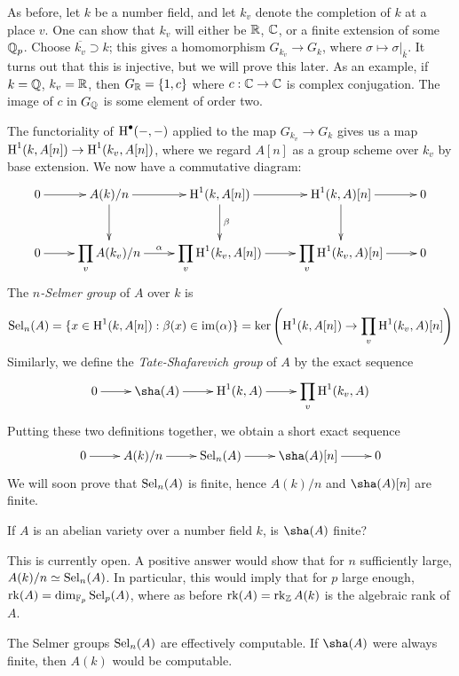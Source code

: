 \documentclass{article}
\begin{document}
As before, let $k$ be a number field, and let $k_v$ denote the completion of 
$k$ at a place $v$. One can show that $k_v$ will either be $\mathbb{R}$, $\mathbb{C}$, or a 
finite extension of some $\mathbb{Q}_p$. Choose $\overline{k_v}\supset k$; this gives 
a homomorphism $G_{k_v} \to G_k$, where $\sigma\mapsto \sigma|_{\bar k}$. It 
turns out that this is injective, but we will prove this later. As an example, 
if $k=\mathbb{Q}$, $k_v=\mathbb{R}$, then $G_{\mathbb{R}}=\{1,c\}$ where $c:\mathbb{C}\to \mathbb{C}$ is complex 
conjugation. The image of $c$ in $G_{\mathbb{Q}}$ is some element of order two. 

The functoriality of $\operatorname{H}^\bullet(-,-)$ applied to the map $G_{k_v} \to G_k$ 
gives us a map $\operatorname{H}^1(k,A[n]) \to \operatorname{H}^1(k_v,A[n])$, where we regard $A[n]$ as a 
group scheme over $k_v$ by base extension. We now have a commutative diagram: 
\[\xymatrix{
  0 \ar[r] 
    & A(k)/n \ar[r] \ar[d] 
    & \h^1(k,A[n]) \ar[r] \ar[d]^-\beta 
    & \h^1(k,A)[n] \ar[r] \ar[d] 
    & 0 \\
  0 \ar[r] 
    & \displaystyle\prod_v A(k_v)/n \ar[r]^-\alpha 
    & \displaystyle\prod_v \h^1(k_v,A[n]) \ar[r] 
    & \displaystyle\prod_v \h^1(k_v,A)[n] \ar[r] 
    & 0
}\]
The \emph{$n$-Selmer group} of $A$ over $k$ is 
\begin{align*}
  \operatorname{Sel}_n(A) = \{x\in \operatorname{H}^1(k,A[n]) : \beta(x) \in \operatorname{im}(\alpha)\} 
    = \ker\left(\operatorname{H}^1(k,A[n]) \to \prod_v \operatorname{H}^1(k_v,A)[n]\right)
\end{align*}
Similarly, we define the \emph{Tate-Shafarevich group} of $A$ by the exact 
sequence 
\[\xymatrix{
  0 \ar[r] 
    & \sha(A) \ar[r] 
    & \h^1(k,A) \ar[r]
    & \displaystyle\prod_v \h^1(k_v,A)
}\]
Putting these two definitions together, we obtain a short exact 
sequence 
\[\xymatrix{
  0 \ar[r] 
    & A(k)/n \ar[r] 
    & \sel_n(A) \ar[r] 
    & \sha(A)[n] \ar[r] 
    & 0
}\]
We will soon prove that $\operatorname{Sel}_n(A)$ is finite, hence $A(k)/n$ and 
$\sha(A)[n]$ are finite. 

\begin{question}
If $A$ is an abelian variety over a number field $k$, is $\sha(A)$ finite?
\end{question}
This is currently open. A positive answer would show that for $n$ sufficiently 
large, $A(k)/n \simeq \operatorname{Sel}_n(A)$. In particular, this would imply that for $p$ 
large enough, $\operatorname{rk}(A) = \dim_{\mathbb{F}_p} \operatorname{Sel}_p(A)$, where as before 
$\operatorname{rk}(A) = \operatorname{rk}_{\mathbb{Z}} A(k)$ is the algebraic rank of 
$A$. 

\begin{remark}
The Selmer groups $\operatorname{Sel}_n(A)$ are effectively computable. If $\sha(A)$ were 
always finite, then $A(k)$ would be computable. 
\end{remark}
\end{document}
